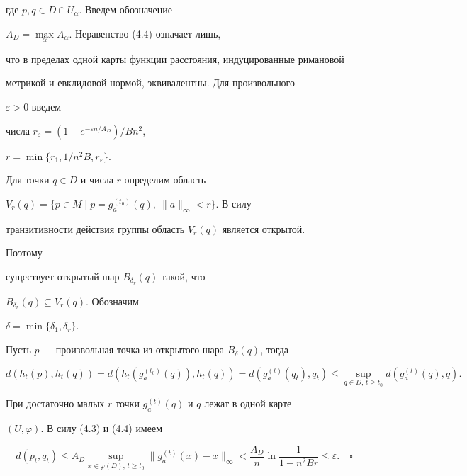 где $p,q\in D\cap U_\alpha$. Введем обозначение 


$A_D=\max\limits_\alpha A_\alpha$. Неравенство (4.4) означает лишь, 


что в пределах одной карты функции расстояния, индуцированные римановой 


метрикой и евклидовой нормой, эквивалентны. Для произвольного 


$\varepsilon>0$ введем 


числа $r_\varepsilon=(1-e^{-\varepsilon n/A_D})/B n^2$, 


$r=\min\{r_1,1/n^2B,r_\varepsilon\}$. 


Для точки $q\in D$ и числа $r$ определим область 


$V_r(q)=\{p\in M\mid p=g^{(t_0)}_a(q),\ \|a\|_\infty<r\}$. В силу 


транзитивности действия группы область $V_r(q)$ является открытой. 


Поэтому 


существует открытый шар $B_{\delta_r}(q)$ такой, что 


$B_{\delta_r}(q)\subseteq V_r(q)$. Обозначим 


$\delta=\min\{\delta_1,\delta_r\}$. 


Пусть $p$ --- произвольная точка из открытого шара $B_\delta(q)$, тогда 


$$ 


d(h_t(p),h_t(q))=d(h_t(g^{(t_0)}_a(q)),h_t(q))= 


d(g^{(t)}_a(q_t),q_t)\le 


\sup_{q\in D,\,t\ge t_0}d(g^{(t)}_a(q),q). 


$$ 


При достаточно малых $r$ точки $g^{(t)}_a(q)$ и $q$ лежат в одной карте 


$(U,\varphi)$. В силу (4.3) и (4.4) имеем 


$$ 


d(p_t,q_t)\le A_D\sup_{x\in\varphi(D),\,t\ge t_0} 


\|g^{(t)}_a(x)-x\|_\infty<\frac{A_D}{n}\ln 


\frac{1}{1-n^2B r}\le\varepsilon.\quad\square 


$$ 


 


